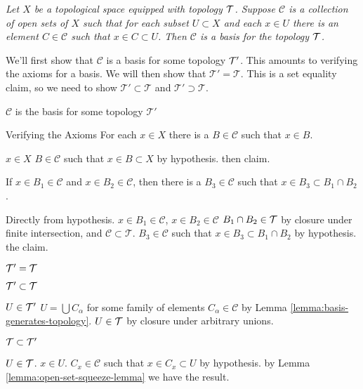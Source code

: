 %
{\itshape %
Let $X$ be a topological space equipped with topology $\mathcal{T}$.
Suppose $\mathcal{C}$ is a collection of open sets of $X$ such that for
each subset $U\subset X$ and each $x\in U$ there is an element
$C\in\mathcal{C}$ such that $x\in C\subset U$.
Then $\mathcal{C}$ is a basis for the topology $\mathcal{T}$.}

\smallskip

\begin{pfSketch}
  We'll first show that $\mathcal{C}$ is a basis for some topology
  $\mathcal{T'}$. This amounts to verifying the axioms for a basis. We
  will then show that $\mathcal{T'}=\mathcal{T}$. This is a set equality
  claim, so we need to show $\mathcal{T'}\subset\mathcal{T}$ and
  $\mathcal{T'}\supset\mathcal{T}$. 
\end{pfSketch}

\begin{spf}
  \step $\mathcal{C}$ is the basis for some topology $\mathcal{T'}$
  \begin{spf}
    Verifying the Axioms
    \step For each $x\in X$ there is a $B\in\mathcal{C}$ such that $x\in B$.
    \begin{spf}
      \Let $x\in X$
      \ThenConsider $B\in\mathcal{C}$ such that $x\in B\subset X$ by hypothesis.
      \Hence then claim.
    \end{spf}
    \step If $x\in B_{1}\in\mathcal{C}$ and
    $x\in B_{2}\in\mathcal{C}$, then there is a
    $B_{3}\in\mathcal{C}$ such that $x\in B_{3}\subset B_{1}\cap B_{2}$.
    \begin{spf}
      Directly from hypothesis.
      \Assume $x\in B_{1}\in\mathcal{C}$, $x\in B_{2}\in\mathcal{C}$
      \Thus $B_{1}\cap B_{2}\in\mathcal{T}$ by closure under finite
      intersection, and $\mathcal{C}\subset\mathcal{T}$.
      \ThenConsider $B_{3}\in\mathcal{C}$ such that
      $x\in B_{3}\subset B_{1}\cap B_{2}$ by hypothesis.
      \Hence the claim.
    \end{spf}
  \end{spf}
  \step $\mathcal{T'}=\mathcal{T}$
  \begin{spf}
    \step $\mathcal{T'}\subset\mathcal{T}$
    \begin{spf}
      \Let $U\in\mathcal{T'}$
      \Then $U=\bigcup C_{\alpha}$ for some family of elements $C_{\alpha}\in\mathcal{C}$ by Lemma \ref{lemma:basis-generates-topology}.
      \Hence $U\in\mathcal{T}$ by closure under arbitrary unions.
    \end{spf}
    \step $\mathcal{T}\subset\mathcal{T'}$
    \begin{spf}
      \Let $U\in\mathcal{T}$.
      \Let $x\in U$.
      \ThenConsider $C_{x}\in\mathcal{C}$ such that $x\in C_{x}\subset
      U$
      by hypothesis.
      \Hence by Lemma \ref{lemma:open-set-squeeze-lemma} we have the result.\placeQED
    \end{spf}
  \end{spf}
\end{spf}

